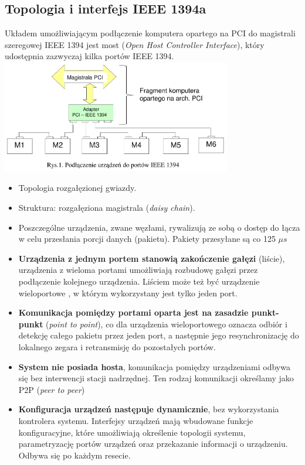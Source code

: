 \subsection{Topologia i interfejs IEEE 1394a}
Układem umożliwiającym podłączenie komputera opartego na PCI do magistrali szeregowej IEEE 1394 jest most (\emph{Open Host Controller Interface}), który udostępnia zazwyczaj kilka portów IEEE 1394.\\
\includegraphics[width=10cm]{./wyklady/FIREWIRE_2_1.pdf}\\
\begin{itemize}
	\item Topologia rozgałęzionej gwiazdy.
	\item Struktura: rozgałęziona magistrala (\emph{daisy chain}).
	\item Poszczególne urządzenia, zwane węzłami, rywalizują ze sobą o dostęp do łącza w celu przesłania porcji danych (pakietu). Pakiety przesyłane są co 125 $\mu s$
	\item \textbf{Urządzenia z jednym portem stanowią zakończenie gałęzi} (liście), urządzenia z wieloma portami umożliwiają rozbudowę gałęzi przez podłączenie kolejnego urządzenia. Liściem może też być urządzenie wieloportowe , w którym wykorzystany jest tylko jeden port.
	\item \textbf{Komunikacja pomiędzy portami oparta jest na zasadzie punkt-punkt} (\emph{point to point}), co dla urządzenia wieloportowego oznacza odbiór i detekcję całego pakietu przez jeden port, a następnie jego resynchronizację do lokalnego zegara i retransmisję do pozostałych portów.
	\item \textbf{System nie posiada hosta}, komunikacja pomiędzy urządzeniami odbywa się bez interwencji stacji nadrzędnej. Ten rodzaj komunikacji określamy jako P2P (\emph{peer to peer})
	\item \textbf{Konfiguracja urządzeń następuje dynamicznie}, bez wykorzystania kontrolera systemu. Interfejsy urządzeń mają wbudowane funkcje konfiguracyjne, które umożliwiają określenie topologii systemu, parametryzację portów urządzeń oraz przekazanie informacji o urządzeniu. Odbywa się po każdym resecie.
\end{itemize}


